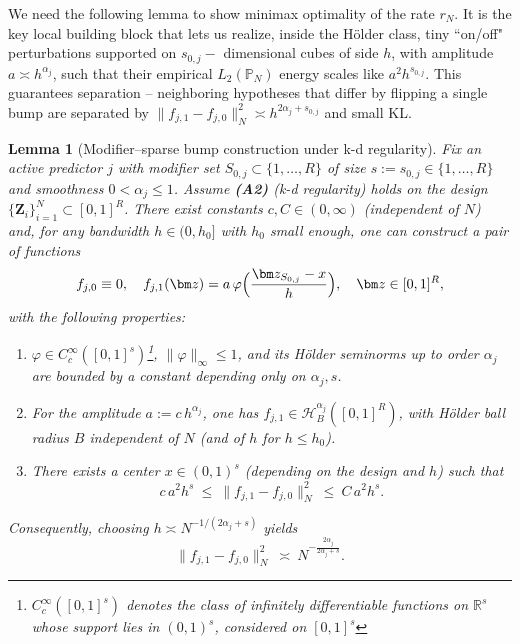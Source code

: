 \documentclass[11pt]{article}
\theoremstyle{plain}
\newtheorem{lemma}{Lemma}
\theoremstyle{definition}
\theoremstyle{plain}
\begin{document}
We need the following lemma to show minimax optimality of the rate $r_N$. It is the key local building block that lets us realize, inside the H\"older class, tiny ``on/off" perturbations supported on $s_{0,j}-$ dimensional cubes of side $h$, with amplitude $a \asymp h^{\alpha_j}$, such that their empirical $L_2(\mathbb{P}_N)$ energy scales like $a^2 h^{s_{0,j}}.$ This guarantees separation -- neighboring hypotheses that differ by flipping a single bump are separated by $\|f_{j,1}-f_{j,0}\|_{N} ^2 \asymp h^{2 \alpha_j+s_{0,j}}$ and small KL.
\begin{lemma}[Modifier--sparse bump construction under k-d regularity]\label{lem:bump}
Fix an active predictor $j$ with modifier set $S_{0,j}\subset\{1,\dots,R\}$ of size $s:=s_{0,j}\in\{1,\dots,R\}$ and smoothness $0<\alpha_j\le 1$. Assume {\textbf{(A2)}} (k-d regularity) holds on the design $\{\bm Z_i\}_{i=1}^N\subset[0,1]^R$.
There exist constants $c,C\in(0,\infty)$ (independent of $N$) and, for any bandwidth $h\in(0,h_0]$ with $h_0$ small enough, one can construct a pair of functions
\[
f_{j,0}\equiv 0,
\quad
f_{j,1}(\bm z)= a\,\varphi \Bigl(\frac{\bm z_{S_{0,j}}-x}{h}\Bigr),
\quad \bm z\in[0,1]^R,
\]
with the following properties:
\begin{enumerate}
\item[(i)] $\varphi\in C^\infty_c([0,1]^s)$\footnote{$C^{\infty}_c([0,1]^s)$ denotes the class of infinitely differentiable functions on $\mathbb{R}^s$ whose support lies in $(0,1)^s$, considered on $[0,1]^s$}, $\|\varphi\|_\infty\le 1$, and its H\"older seminorms up to order $\alpha_j$ are bounded by a constant depending only on $\alpha_j,s$.
\item[(ii)] For the amplitude $a:=c\,h^{\alpha_j}$, one has $f_{j,1}\in\mathcal H^{\alpha_j}_B([0,1]^R)$, with H\"older ball radius $B$ independent of $N$ (and of $h$ for $h\le h_0$).
\item[(iii)] There exists a center $x\in(0,1)^s$ (depending on the design and $h$) such that
\[
c\,a^2 h^{s}\ \le\ \|f_{j,1}-f_{j,0}\|_{N}^2\ \le\ C\,a^2 h^{s}.
\]
\end{enumerate}
Consequently, choosing $h\asymp N^{-1/(2\alpha_j+s)}$ yields
\[
\|f_{j,1}-f_{j,0}\|_{N}^2\ \asymp\ N^{-\frac{2\alpha_j}{2\alpha_j+s}}.
\]
\end{lemma}
\end{document}
